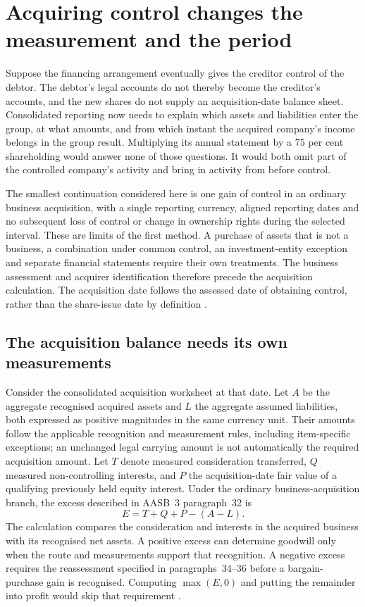 \section{Acquiring control changes the measurement and the period}
\label{sim:acquisition-period-design}

Suppose the financing arrangement eventually gives the creditor control of the debtor. The debtor's legal accounts do not thereby become the creditor's accounts, and the new shares do not supply an acquisition-date balance sheet. Consolidated reporting now needs to explain which assets and liabilities enter the group, at what amounts, and from which instant the acquired company's income belongs in the group result. Multiplying its annual statement by a 75 per cent shareholding would answer none of those questions. It would both omit part of the controlled company's activity and bring in activity from before control.

The smallest continuation considered here is one gain of control in an ordinary business acquisition, with a single reporting currency, aligned reporting dates and no subsequent loss of control or change in ownership rights during the selected interval. These are limits of the first method. A purchase of assets that is not a business, a combination under common control, an investment-entity exception and separate financial statements require their own treatments. The business assessment and acquirer identification therefore precede the acquisition calculation. The acquisition date follows the assessed date of obtaining control, rather than the share-issue date by definition \citep[paras.~2--9]{aasb3scope2026}.

\subsection{The acquisition balance needs its own measurements}

Consider the consolidated acquisition worksheet at that date. Let $A$ be the aggregate recognised acquired assets and $L$ the aggregate assumed liabilities, both expressed as positive magnitudes in the same currency unit. Their amounts follow the applicable recognition and measurement rules, including item-specific exceptions; an unchanged legal carrying amount is not automatically the required acquisition amount. Let $T$ denote measured consideration transferred, $Q$ measured non-controlling interests, and $P$ the acquisition-date fair value of a qualifying previously held equity interest. Under the ordinary business-acquisition branch, the excess described in AASB~3 paragraph~32 is
\begin{equation}
 E=T+Q+P-(A-L).
 \label{eq:acquisition-conditional-excess}
\end{equation}
The calculation compares the consideration and interests in the acquired business with its recognised net assets. A positive excess can determine goodwill only when the route and measurements support that recognition. A negative excess requires the reassessment specified in paragraphs~34--36 before a bargain-purchase gain is recognised. Computing $\max(E,0)$ and putting the remainder into profit would skip that requirement \citep[paras.~10--21, 24--36]{aasb3scope2026}.

